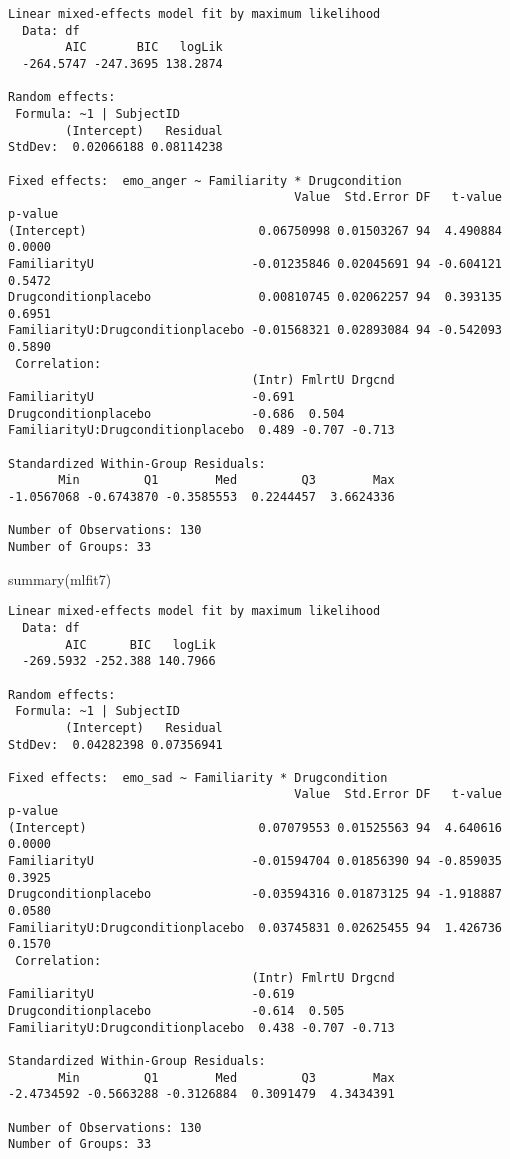 \documentclass[
  man,
  longtable,
  nolmodern,
  notxfonts,
  notimes,
  colorlinks=true,linkcolor=blue,citecolor=blue,urlcolor=blue]{apa7}
\newenvironment{Shaded}{\begin{snugshade}}{\end{snugshade}}
\newcommand{\FunctionTok}[1]{\textcolor[rgb]{0.28,0.35,0.67}{#1}}
\newcommand{\NormalTok}[1]{\textcolor[rgb]{0.00,0.23,0.31}{#1}}
\begin{document}
\begin{verbatim}
Linear mixed-effects model fit by maximum likelihood
  Data: df 
        AIC       BIC   logLik
  -264.5747 -247.3695 138.2874

Random effects:
 Formula: ~1 | SubjectID
        (Intercept)   Residual
StdDev:  0.02066188 0.08114238

Fixed effects:  emo_anger ~ Familiarity * Drugcondition 
                                        Value  Std.Error DF   t-value p-value
(Intercept)                        0.06750998 0.01503267 94  4.490884  0.0000
FamiliarityU                      -0.01235846 0.02045691 94 -0.604121  0.5472
Drugconditionplacebo               0.00810745 0.02062257 94  0.393135  0.6951
FamiliarityU:Drugconditionplacebo -0.01568321 0.02893084 94 -0.542093  0.5890
 Correlation: 
                                  (Intr) FmlrtU Drgcnd
FamiliarityU                      -0.691              
Drugconditionplacebo              -0.686  0.504       
FamiliarityU:Drugconditionplacebo  0.489 -0.707 -0.713

Standardized Within-Group Residuals:
       Min         Q1        Med         Q3        Max 
-1.0567068 -0.6743870 -0.3585553  0.2244457  3.6624336 

Number of Observations: 130
Number of Groups: 33 
\end{verbatim}

\begin{Shaded}
\begin{Highlighting}[]
\FunctionTok{summary}\NormalTok{(mlfit7)}
\end{Highlighting}
\end{Shaded}

\begin{verbatim}
Linear mixed-effects model fit by maximum likelihood
  Data: df 
        AIC      BIC   logLik
  -269.5932 -252.388 140.7966

Random effects:
 Formula: ~1 | SubjectID
        (Intercept)   Residual
StdDev:  0.04282398 0.07356941

Fixed effects:  emo_sad ~ Familiarity * Drugcondition 
                                        Value  Std.Error DF   t-value p-value
(Intercept)                        0.07079553 0.01525563 94  4.640616  0.0000
FamiliarityU                      -0.01594704 0.01856390 94 -0.859035  0.3925
Drugconditionplacebo              -0.03594316 0.01873125 94 -1.918887  0.0580
FamiliarityU:Drugconditionplacebo  0.03745831 0.02625455 94  1.426736  0.1570
 Correlation: 
                                  (Intr) FmlrtU Drgcnd
FamiliarityU                      -0.619              
Drugconditionplacebo              -0.614  0.505       
FamiliarityU:Drugconditionplacebo  0.438 -0.707 -0.713

Standardized Within-Group Residuals:
       Min         Q1        Med         Q3        Max 
-2.4734592 -0.5663288 -0.3126884  0.3091479  4.3434391 

Number of Observations: 130
Number of Groups: 33 
\end{verbatim}
\end{document}

